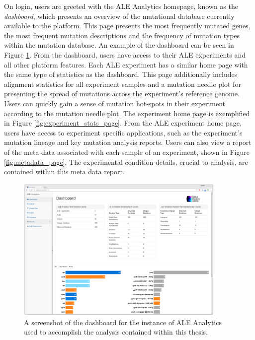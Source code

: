 \documentclass[12pt,final,masters,chapterheads]{ucsd}  %
\begin{document}
On login, users are greeted with the ALE Analytics homepage, known as the \textit{dashboard}, which presents an overview of the mutational database currently available to the platform. This page presents the most frequently mutated genes, the most frequent mutation descriptions and the frequency of mutation types within the mutation database. An example of the dashboard can be seen in Figure \ref{fig:thesis_dashboard_page}. From the dashboard, users have access to their ALE experiments and all other platform features. Each ALE experiment has a similar home page with the same type of statistics as the dashboard. This page additionally includes alignment statistics for all experiment samples and a mutation needle plot \cite{michael_p_schroeder_2015_14561} for presenting the spread of mutations across the experiment's reference genome. Users can quickly gain a sense of mutation hot-spots in their experiment according to the mutation needle plot. The experiment home page is exemplified in Figure \ref{fig:experiment_stats_page}. From the ALE experiment home page, users have access to experiment specific applications, such as the experiment's mutation lineage and key mutation analysis reports. Users can also view a report of the meta data associated with each sample of an experiment, shown in Figure \ref{fig:metadata_page}. The experimental condition details, crucial to analysis, are contained within this meta data report.
\begin{figure}[H]
  \centering
  \includegraphics[width=0.9\textwidth]{thesis_dashboard_page.png}
  \caption{A screenshot of the dashboard for the instance of ALE Analytics used to accomplish the analysis contained within this thesis.}
  \label{fig:thesis_dashboard_page}
\end{figure}
\end{document}
